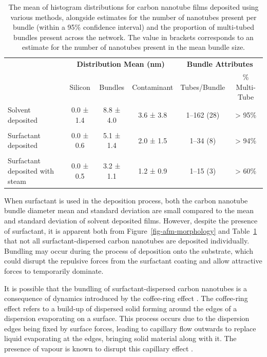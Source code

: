 \documentclass[
  a4paper,
]{scrbook}
\begin{document}
\hypertarget{tbl-histogram-parameters}{}
\begin{table}
\caption{\label{tbl-histogram-parameters}The mean of histogram distributions for carbon nanotube films deposited
using various methods, alongside estimates for the number of nanotubes
present per bundle (within a 95\% confidence interval) and the
proportion of multi-tubed bundles present across the network. The value
in brackets corresponds to an estimate for the number of nanotubes
present in the mean bundle size. }\tabularnewline

\centering
\begin{tabular}{>{\raggedright\arraybackslash}p{2cm}ccccc}
\toprule
\multicolumn{1}{c}{\textbf{ }} & \multicolumn{3}{c}{\textbf{Distribution Mean (nm)}} & \multicolumn{2}{c}{\textbf{Bundle Attributes}} \\
\cmidrule(l{3pt}r{3pt}){2-4} \cmidrule(l{3pt}r{3pt}){5-6}
 & Silicon & Bundles & Contaminant & Tubes/Bundle & \% Multi-Tube\\
\midrule
Solvent deposited & 0.0 ± 1.4 & 8.8 ± 4.0 & 3.6 ± 3.8 & 1–162 (28) & > 95\%\\
 &  &  &  &  \vphantom{1} & \\
Surfactant deposited & 0.0 ± 0.6 & 5.1 ± 1.4 & 2.0 ± 1.5 & 1–34 (8) & > 94\%\\
 &  &  &  &  & \\
Surfactant deposited with steam & 0.0 ± 0.5 & 3.2 ± 1.1 & 1.2 ± 0.9 & 1–15 (3) & > 60\%\\
\bottomrule
\end{tabular}
\end{table}

When surfactant is used in the deposition process, both the carbon
nanotube bundle diameter mean and standard deviation are small compared
to the mean and standard deviation of solvent deposited films. However,
despite the presence of surfactant, it is apparent both from
Figure~\ref{fig-afm-morphology} and Table~\ref{tbl-histogram-parameters}
that not all surfactant-dispersed carbon nanotubes are deposited
individually. Bundling may occur during the process of deposition onto
the substrate, which could disrupt the repulsive forces from the
surfactant coating and allow attractive forces to temporarily dominate.

It is possible that the bundling of surfactant-dispersed carbon
nanotubes is a consequence of dynamics introduced by the coffee-ring
effect \autocite{Deegan1997,VanGaalen2021}. The coffee-ring effect
refers to a build-up of dispersed solid forming around the edges of a
dispersion evaporating on a surface. This process occurs due to the
dispersion edges being fixed by surface forces, leading to capillary
flow outwards to replace liquid evaporating at the edges, bringing solid
material along with it. The presence of vapour is known to disrupt this
capillary effect \autocite{Bishop2020}.
\end{document}
